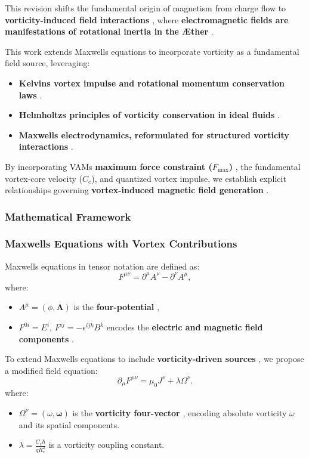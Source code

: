This revision shifts the fundamental origin of magnetism from charge flow to \textbf{vorticity-induced field interactions} , where \textbf{electromagnetic fields are manifestations of rotational inertia in the Æther} .

This work extends Maxwell\rqs s equations to incorporate vorticity as a fundamental field source, leveraging:
\begin{itemize}
    \item \textbf{Kelvin\rqs s vortex impulse and rotational momentum conservation laws}  \cite{kelvin1867}.
    \item \textbf{Helmholtz\rqs s principles of vorticity conservation in ideal fluids}  \cite{helmholtz1858}.
    \item \textbf{Maxwell\rqs s electrodynamics, reformulated for structured vorticity interactions}  \cite{maxwell1861}.
\end{itemize}
By incorporating VAM\rqs s \textbf{maximum force constraint (\( F_{\max} \))} , the fundamental vortex-core velocity (\( C_e \)), and quantized vortex impulse, we establish explicit relationships governing \textbf{vortex-induced magnetic field generation} .

\subsubsection*{Mathematical Framework}

\subsubsection*{Maxwell\rqs s Equations with Vortex Contributions}
Maxwell\rqs s equations in tensor notation are defined as:
\begin{equation*}
    F^{\mu\nu} = \partial^\mu A^\nu - \partial^\nu A^\mu,
\end{equation*}
where:
\begin{itemize}
    \item \( A^\mu = (\phi, \mathbf{A}) \) is the \textbf{four-potential} ,
    \item \( F^{0i} = E^i \), \( F^{ij} = -\epsilon^{ijk} B^k \) encodes the \textbf{electric and magnetic field components} .
\end{itemize}

To extend Maxwell\rqs s equations to include \textbf{vorticity-driven sources} , we propose a modified field equation:
\begin{equation*}
    \partial_\mu F^{\mu\nu} = \mu_0 J^\nu + \lambda \Omega^\nu.
\end{equation*}
where:
\begin{itemize}
    \item \( \Omega^\nu = (\omega, \mathbf{\omega}) \) is the \textbf{vorticity four-vector} , encoding absolute vorticity \( \omega \) and its spatial components.
    \item \( \lambda = \frac{C_e \hbar}{q R_c^2} \) is a vorticity coupling constant.
\end{itemize}

